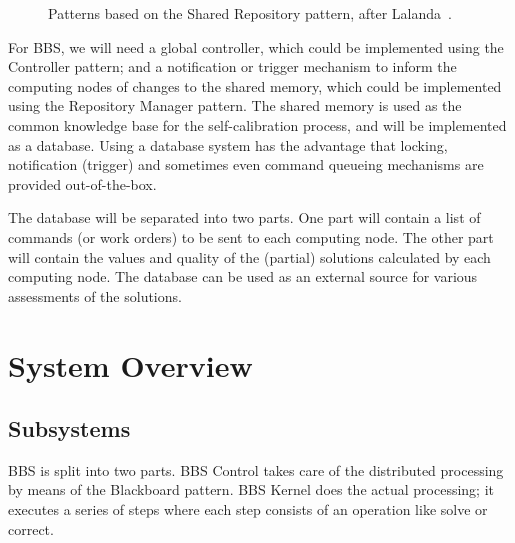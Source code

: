 \documentclass[10pt]{lofar}
\begin{document}
\begin{figure}[!ht]
\centering
{}
\caption{Patterns based on the Shared Repository pattern, after Lalanda~\cite{Lalanda1998}.}
\label{fig:shared-repository-pattern}
\end{figure}

For BBS, we will need a global controller, which could be implemented using
the Controller pattern; and a notification or trigger mechanism to inform the
computing nodes of changes to the shared memory, which could be implemented
using the Repository Manager pattern. The shared memory is used as the common
knowledge base for the self-calibration process, and will be implemented as a
database. Using a database system has the advantage that locking, notification
(trigger) and sometimes even command queueing mechanisms are provided
out-of-the-box.

The database will be separated into two parts. One part will contain a list of
commands (or work orders) to be sent to each computing node. The other part
will contain the values and quality of the (partial) solutions calculated by
each computing node. The database can be used as an external source for
various assessments of the solutions.

\cleardoublepage

\section{System Overview}
\label{sec:overview}

\subsection{Subsystems}
\label{subsec:subsystems}
BBS is split into two parts. BBS Control takes care of the distributed
processing by means of the Blackboard pattern. BBS Kernel does the actual
processing; it executes a series of steps where each step consists of an
operation like solve or correct.
\end{document}
